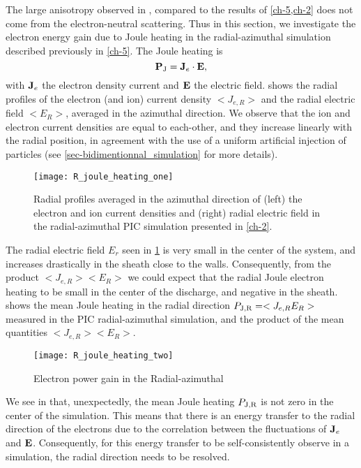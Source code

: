   The large anisotropy observed in , compared to the results of \cref{ch-5,ch-2} does not come from the electron-neutral scattering.
  Thus in this section, we investigate the electron energy gain due to Joule heating in the radial-azimuthal simulation described previously in \cref{ch-5}.
  The Joule heating is
  \begin{equation} \label{eq-epower}
      {\mathbf P_{\rm J}} = {\mathbf J_e} \cdot {\mathbf E},
  \end{equation}
  with ${\mathbf J_e}$ the electron density current and ${\mathbf E}$ the electric field.
   shows the radial profiles of the electron (and ion) current density $< J_{e, R}>$ and the radial electric field $ < E_R >$, averaged in the azimuthal direction.
  We observe that the ion and electron current densities are equal to each-other, and they increase linearly with the radial position, in agreement with the use of a uniform artificial injection of particles (see \cref{sec-bidimentionnal_simulation} for more details).

  \begin{figure}[hbt]
    \centering
    \texttt{[image: R\_joule\_heating\_one]}
    \caption{Radial profiles averaged in the azimuthal direction of (left) the electron and ion current densities and (right) radial electric field in the radial-azimuthal \acs{PIC} simulation presented in \cref{ch-2}. }
    \label{fig-epower_radialone}
  \end{figure}
  
  The radial electric field $E_r$ seen in \cref{fig-epower_radialone} is very small in the center of the system, and increases drastically in the sheath close to the walls.
  Consequently, from the product $< J_{e, R}>  < E_R >$ we could expect that the radial Joule electron heating to be small in the center of the discharge, and negative in the sheath.
   shows the mean Joule heating in the radial direction ${P_{\rm J, R}} = < J_{e, R} E_R >$ measured in the \ac{PIC} radial-azimuthal simulation, and the product of the mean quantities $< J_{e, R}>  < E_R >$.

  \begin{figure}[hbt]
    \centering
    \texttt{[image: R\_joule\_heating\_two]}
    \caption{Electron power gain in the Radial-azimuthal }
    \label{fig-epower_radial}
  \end{figure}

  We see in  that, unexpectedly,  the mean Joule heating ${P_{\rm J, R}}$ is not zero in the center of the simulation.
  This means that there is an energy transfer to the radial direction of the electrons due to the correlation between the fluctuations of ${\mathbf J_e}$ and ${\mathbf E}$.
  Consequently, for this energy transfer to be self-consistently observe in a simulation, the radial direction needs to be resolved.

